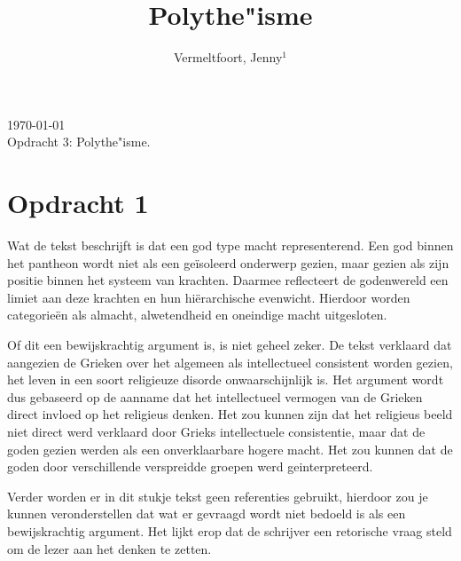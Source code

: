 \documentclass[10pt]{amsart}
\begin{document}
\setcounter{page}{1}

\hfill     {\small \today} \\
{\small Opdracht 3: Polythe"isme.}\hfill
{\small } %

\centerline{}

\centerline{}

\title[Polythe"isme]{Polythe"isme}

\author[J. Vermeltfoort]{Vermeltfoort, Jenny$^1$}

\address{$^{1}$ 3787494, Faculteit Geesteswetenschappen, Leiden
     Universiteit, Leiden, Nederland.}
\email{\textcolor[rgb]{0.00,0.00,0.84}{j.vermeltfoort@umail.leidenuniv.nl}}

\maketitle

\section*{Opdracht 1}

\noindent Wat de tekst beschrijft is dat een god type macht representerend. Een god binnen het pantheon wordt niet als een geïsoleerd onderwerp gezien, maar gezien als zijn positie binnen het systeem van krachten. Daarmee reflecteert de godenwereld een limiet aan deze krachten en hun hiërarchische evenwicht. Hierdoor worden categorieën als almacht, alwetendheid en oneindige macht uitgesloten. \autocite{vernantGreceAncienneEtude1976}

Of dit een bewijskrachtig argument is, is niet geheel zeker. De tekst verklaard dat aangezien de Grieken over het algemeen als intellectueel consistent worden gezien, het leven in een soort religieuze disorde onwaarschijnlijk is. Het argument wordt dus gebaseerd op de aanname dat het intellectueel vermogen van de Grieken direct invloed op het religieus denken. Het zou kunnen zijn dat het religieus beeld niet direct werd verklaard door Grieks intellectuele consistentie, maar dat de goden gezien werden als een onverklaarbare hogere macht. Het zou kunnen dat de goden door verschillende verspreidde groepen werd geinterpreteerd. 

Verder worden er in dit stukje tekst geen referenties gebruikt, hierdoor zou je kunnen veronderstellen dat wat er gevraagd wordt niet bedoeld is als een bewijskrachtig argument. Het lijkt erop dat de schrijver een retorische vraag steld om de lezer aan het denken te zetten.
\end{document}
